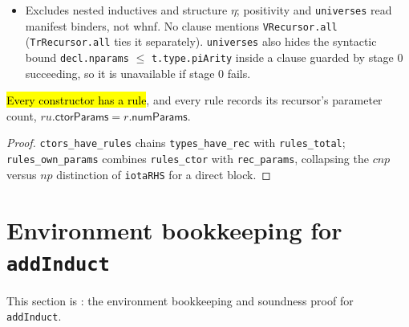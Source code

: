 \begin{definition}
\begin{center}
\end{center}
\begin{itemize}
\item {} Excludes nested inductives and structure $\eta$; positivity and
\texttt{universes} read manifest binders, not whnf. No clause mentions
\texttt{VRecursor.all} (\texttt{TrRecursor.all}
 ties it separately).
\texttt{universes} also hides the syntactic bound \texttt{decl.nparams}
$\le$ \texttt{t.type.piArity} inside a clause guarded by stage 0 succeeding, so it is
unavailable if stage 0 fails.
\end{itemize}
\end{definition}

\begin{lemma}
\label{family:ind-wf-corollaries}
\leanok
{} 

 \hl{Every constructor has a rule}, and every rule records its recursor's
parameter count, $ru.\mathsf{ctorParams}=r.\mathsf{numParams}$.
\end{lemma}
\begin{proof}
\leanok
{} \texttt{ctors\_have\_rules} chains \texttt{types\_have\_rec} with
\texttt{rules\_total}; \texttt{rules\_own\_params} combines \texttt{rules\_ctor} with
\texttt{rec\_params}, collapsing the $cnp$ versus $np$ distinction of \texttt{iotaRHS} for a
direct block.
\end{proof}

\section{Environment bookkeeping for \texorpdfstring{\texttt{addInduct}}{addInduct}}

This section is : the environment
bookkeeping and soundness proof for \texttt{addInduct}.

